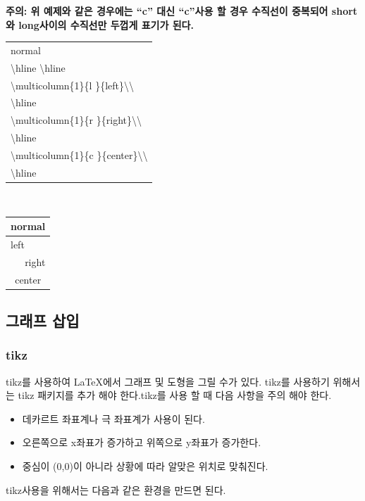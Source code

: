 \documentclass[12pt]{article}
\begin{document}
	\textbf{주의: 위 예제와 같은 경우에는 ``c\textbar'' 대신 ``\textbar c\textbar''\를 사용 할 경우 수직선이 중복되어 short와 long사이의 수직선만 두껍게 표기가 된다.}\newline
	\begin{center}
		\onehalfspacing
		\begin{tabular}{|l|}
			\hline
			normal\\
			\textbackslash hline
			\textbackslash hline\\
			\textbackslash multicolumn\{1\}\{\textbar l \textbar\}\{left\}\textbackslash\textbackslash\\
			\textbackslash hline\\
			\textbackslash multicolumn\{1\}\{\textbar r \textbar\}\{right\}\textbackslash\textbackslash\\
			\textbackslash hline\\
			\textbackslash multicolumn\{1\}\{\textbar c \textbar\}\{center\}\textbackslash\textbackslash\\
			\textbackslash hline\\
			\hline
		\end{tabular}
		\ \ \ \ \ \ 
		\begin{tabular}{|l|}
			\hline
			normal\\
			\hline
			\multicolumn{1}{|l|}{left}\\
			\hline
			\multicolumn{1}{|r|}{right}\\
			\hline
			\multicolumn{1}{|c|}{center}\\
			\hline
		\end{tabular}
	\end{center}\clearpage
	\subsection{그래프 삽입}
	\subsubsection{tikz}
	tikz를 사용하여 \LaTeX 에서 그래프 및 도형을 그릴 수가 있다. tikz를 사용하기 위해서는 tikz 패키지를 추가 해야 한다.\newline tikz를 사용 할 때 다음 사항을 주의 해야 한다.
	\begin{itemize}
		\item 데카르트 좌표계나 극 좌표계가 사용이 된다.
		\item 오른쪽으로 x좌표가 증가하고 위쪽으로 y좌표가 증가한다.
		\item 중심이 (0,0)이 아니라 상황에 따라 알맞은 위치로 맞춰진다.
	\end{itemize}
	tikz사용을 위해서는 다음과 같은 환경을 만드면 된다.\newline
	
\end{document}
